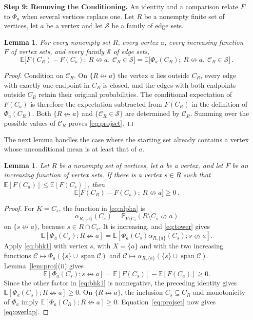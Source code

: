 \documentclass[11pt]{article}
\newtheorem{lemma}[theorem]{Lemma}
\theoremstyle{definition}
\theoremstyle{remark}
\newcommand{\PP}{\mathbb P}
\newcommand{\EE}{\mathbb E}
\newcommand{\ncon}{\nleftrightarrow}
\newcommand{\eC}{\mathcal C}
\DeclareMathOperator{\spn}{span}
\begin{document}
\medskip\noindent\textbf{Step 9: Removing the Conditioning.}
An identity and a comparison relate $F$ to $\Phi_a$ when several vertices replace one. Let $R$
be a nonempty finite set of vertices, let $a$ be a vertex and let $\mathcal S$ be a family
of edge sets.

\begin{lemma}\label{lem:projset}
For every nonempty set $R$, every vertex $a$, every increasing function $F$ of vertex
sets, and every family $\mathcal S$ of edge sets,
\begin{equation}\label{eq:projset}
 \EE\bigl[F(C_R)-F(C_a);\ R\ncon a,\ \eC_R\in\mathcal S\bigr]
 =\EE\bigl[\Phi_a(C_R);\ R\ncon a,\ \eC_R\in\mathcal S\bigr]\,.
\end{equation}
\end{lemma}

\begin{proof}
Condition on $\eC_R$. On $\{R\ncon a\}$ the vertex $a$ lies outside $C_R$, every edge
with exactly one endpoint in $C_R$ is closed, and the edges with both endpoints outside
$C_R$ retain their original probabilities. The conditional expectation of $F(C_a)$ is
therefore the expectation subtracted from $F(C_R)$ in the definition of $\Phi_a(C_R)$.
Both $\{R\ncon a\}$ and $\{\eC_R\in\mathcal S\}$ are determined by $\eC_R$. Summing over
the possible values of $\eC_R$ proves \eqref{eq:projset}.
\end{proof}

The next lemma handles the case where the starting set already contains a vertex whose
unconditional mean is at least that of $a$.

\begin{lemma}\label{lem:overlap}
Let $R$ be a nonempty set of vertices, let $a$ be a vertex, and let $F$ be an increasing
function of vertex sets. If there is a vertex $s\in R$ such that
$\EE[F(C_a)]\leq\EE[F(C_s)]$, then
\begin{equation}\label{eq:overlap}
 \EE\bigl[F(C_R)-F(C_a);\ R\ncon a\bigr]\geq 0\,.
\end{equation}
\end{lemma}

\begin{proof}
For $K=C_s$, the function in \eqref{eq:alpha} is
\[
 \alpha_{R,\{a\}}(C_s)
 =\PP_{V\setminus C_s}(R\setminus C_s\ncon a)
\]
on $\{s\ncon a\}$, because $s\in R\cap C_s$. It is increasing, and
\eqref{eq:tower} gives
\[
 \EE[\Phi_a(C_s);R\ncon a]
 =\EE[\Phi_a(C_s)\alpha_{R,\{a\}}(C_s);s\ncon a].
\]
Apply \eqref{eq:bhk1} with
vertex $s$, with $X=\{a\}$ and with the two increasing functions
$\eC\mapsto\Phi_a(\{s\}\cup\spn\eC)$ and $\eC\mapsto\alpha_{R,\{a\}}(\{s\}\cup\spn\eC)$.
Lemma~\ref{lem:proj}(ii) gives
\[
 \EE[\Phi_a(C_s);s\ncon a]
 =\EE[F(C_s)]-\EE[F(C_a)]\geq0.
\]
Since the other factor in \eqref{eq:bhk1} is nonnegative, the preceding identity gives
$\EE[\Phi_a(C_s);R\ncon a]\geq0$. On $\{R\ncon a\}$, the inclusion
$C_s\subseteq C_R$ and monotonicity of $\Phi_a$ imply
$\EE[\Phi_a(C_R);R\ncon a]\geq0$. Equation~\eqref{eq:projset} now gives
\eqref{eq:overlap}.
\end{proof}
\end{document}
